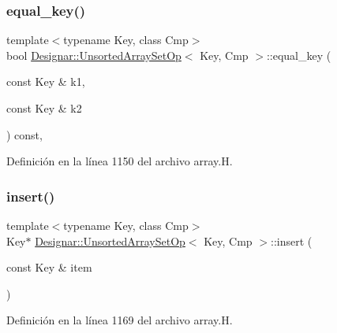 \subsubsection{\texorpdfstring{equal\+\_\+key()}{equal\_key()}}
{\footnotesize\ttfamily template$<$typename Key, class Cmp$>$ \\
bool \hyperlink{class_designar_1_1_unsorted_array_set_op}{Designar\+::\+Unsorted\+Array\+Set\+Op}$<$ Key, Cmp $>$\+::equal\+\_\+key (\begin{DoxyParamCaption}\item[{const Key \&}]{k1,  }\item[{const Key \&}]{k2 }\end{DoxyParamCaption}) const\hspace{0.3cm}{\ttfamily [inline]}, {\ttfamily [protected]}}



Definición en la línea 1150 del archivo array.\+H.

\mbox{\label{class_designar_1_1_unsorted_array_set_op_a7e205053bbcef407bdbde7dae628b2a7}} 
\subsubsection{\texorpdfstring{insert()}{insert()}\hspace{0.1cm}{\footnotesize\ttfamily [1/2]}}
{\footnotesize\ttfamily template$<$typename Key, class Cmp$>$ \\
Key$\ast$ \hyperlink{class_designar_1_1_unsorted_array_set_op}{Designar\+::\+Unsorted\+Array\+Set\+Op}$<$ Key, Cmp $>$\+::insert (\begin{DoxyParamCaption}\item[{const Key \&}]{item }\end{DoxyParamCaption})\hspace{0.3cm}{\ttfamily [inline]}}



Definición en la línea 1169 del archivo array.\+H.

\mbox{\label{class_designar_1_1_unsorted_array_set_op_aaab3531e6bd3e3044560f3645ce2c529}} 
